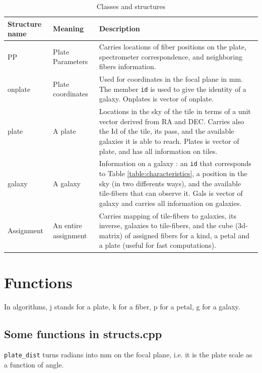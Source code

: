 \documentclass{extarticle}
\begin{document}
\begin{table}[H]\begin{center}
	\begin{tabular}{|l|l|p{12cm}|} \hline
		Structure name & Meaning & Description \\ \hline \hline

		PP & Plate Parameters & Carries locations of fiber positions on the plate, spectrometer correspondence, and neighboring fibers information.\\ 

		onplate & Plate coordinates & Used for coordinates in the focal plane in mm. The member {\tt id} is used to give the identity of a galaxy. Onplates is vector of onplate.\\ 

		plate & A plate & Locations in the sky of the tile in terms of a unit vector derived from RA and DEC. Carries also the Id of the tile, its pass, and the available galaxies it is able to reach. Plates is vector of plate, and has all information on tiles.\\ \hline

		galaxy & A galaxy & Information on a galaxy : an {\tt id} that corresponds to Table \ref{table:characteristics}, a position in the sky (in two differents ways), and the available tile-fibers that can observe it. Gals is vector of galaxy and carries all information on galaxies.\\ \hline

		Assignment & An entire assignment & Carries mapping of tile-fibers to galaxies, its inverse, galaxies to tile-fibers, and the cube (3d-matrix) of assigned fibers for a kind, a petal and a plate (useful for fast computations).\\ \hline
	\end{tabular}\end{center}
	\caption{Classes and structures}\label{tab:structures}
\end{table}


\section{Functions}
In algorithms, j stands for a plate, k for a fiber, p for a petal, g for a galaxy.

\subsection{Some functions in structs.cpp}
{\tt plate\_dist} turns radians into mm on the focal plane, i.e. it is the plate scale as a function of angle.
\end{document}
